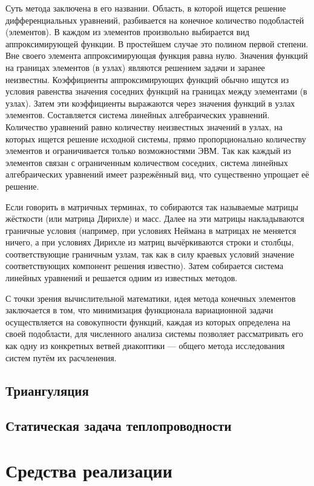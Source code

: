 \documentclass[a4paper, 12pt]{article}
\begin{document}
Суть метода заключена в его названии. Область, в которой ищется решение
дифференциальных уравнений, разбивается на конечное количество подобластей
(элементов). В каждом из элементов произвольно выбирается вид аппроксимирующей
функции. В простейшем случае это полином первой степени. Вне своего элемента
аппроксимирующая функция равна нулю. Значения функций на границах элементов (в
узлах) являются решением задачи и заранее неизвестны. Коэффициенты
аппроксимирующих функций обычно ищутся из условия равенства значения соседних
функций на границах между элементами (в узлах). Затем эти коэффициенты
выражаются через значения функций в узлах элементов. Составляется система
линейных алгебраических уравнений. Количество уравнений равно количеству
неизвестных значений в узлах, на которых ищется решение исходной системы, прямо
пропорционально количеству элементов и ограничивается только возможностями ЭВМ.
Так как каждый из элементов связан с ограниченным количеством соседних, система
линейных алгебраических уравнений имеет разрежённый вид, что существенно
упрощает её решение.

Если говорить в матричных терминах, то собираются так называемые матрицы
жёсткости (или матрица Дирихле) и масс. Далее на эти матрицы накладываются
граничные условия (например, при условиях Неймана в матрицах не меняется ничего,
а при условиях Дирихле из матриц вычёркиваются строки и столбцы, соответствующие
граничным узлам, так как в силу краевых условий значение соответствующих
компонент решения известно). Затем собирается система линейных уравнений и
решается одним из известных методов.

С точки зрения вычислительной математики, идея метода конечных элементов
заключается в том, что минимизация функционала вариационной задачи
осуществляется на совокупности функций, каждая из которых определена на своей
подобласти, для численного анализа системы позволяет рассматривать его как одну
из конкретных ветвей диакоптики — общего метода исследования систем путём их
расчленения.

\subsection{Триангуляция}

\subsection{Статическая задача теплопроводности}

\clearpage
\section{Средства реализации}
\end{document}
